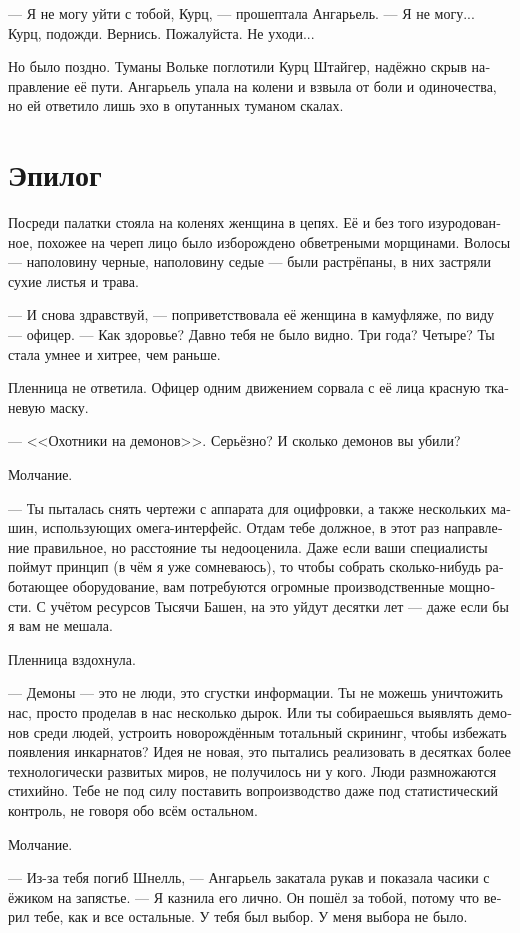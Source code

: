 \documentclass[a4paper,12pt,fleqn]{book}\usepackage{polyglossia}\setdefaultlanguage[babelshorthands=true]{russian}\setotherlanguage{english}\defaultfontfeatures{Ligatures=TeX,Mapping=tex-text}\usepackage{xcolor}\newcommand{\ml}[3]{#2}
\begin{document}
--- Я не могу уйти с тобой, Курц, --- прошептала Ангарьель.
--- Я не могу...
Курц, подожди.
Вернись.
Пожалуйста.
Не уходи...

Но было поздно.
Туманы Вольке поглотили Курц Штайгер, надёжно скрыв направление её пути.
Ангарьель упала на колени и взвыла от боли и одиночества, но ей ответило лишь эхо в опутанных туманом скалах.

\section{Эпилог}

Посреди палатки стояла на коленях женщина в цепях.
Её и без того изуродованное, похожее на череп лицо было изборождено обветреными морщинами.
Волосы --- наполовину черные, наполовину седые --- были растрёпаны, в них застряли сухие листья и трава.

--- И снова здравствуй, --- поприветствовала её женщина в камуфляже, по виду --- офицер.
--- Как здоровье?
Давно тебя не было видно.
Три года?
Четыре?
Ты стала умнее и хитрее, чем раньше.

Пленница не ответила.
Офицер одним движением сорвала с её лица красную тканевую маску.

--- <<Охотники на демонов>>.
Серьёзно?
И сколько демонов вы убили?

Молчание.

--- Ты пыталась снять чертежи с аппарата для оцифровки, а также нескольких машин, использующих омега-интерфейс.
Отдам тебе должное, в этот раз направление правильное, но расстояние ты недооценила.
Даже если ваши специалисты поймут принцип (в чём я уже сомневаюсь), то чтобы собрать сколько-нибудь работающее оборудование, вам потребуются огромные производственные мощности.
С учётом ресурсов Тысячи Башен, на это уйдут десятки лет --- даже если бы я вам не мешала.

Пленница вздохнула.

--- Демоны --- это не люди, это сгустки информации.
Ты не можешь уничтожить нас, просто проделав в нас несколько дырок.
Или ты собираешься выявлять демонов среди людей, устроить новорождённым тотальный скрининг, чтобы избежать появления инкарнатов?
Идея не новая, это пытались реализовать в десятках более технологически развитых миров, не получилось ни у кого.
Люди размножаются стихийно.
Тебе не под силу поставить вопроизводство даже под статистический контроль, не говоря обо всём остальном.

Молчание.

--- Из-за тебя погиб Шнелль, --- Ангарьель закатала рукав и показала часики с ёжиком на запястье.
--- Я казнила его лично.
Он пошёл за тобой, потому что верил тебе, как и все остальные.
У тебя был выбор.
У меня выбора не было.
\end{document}
